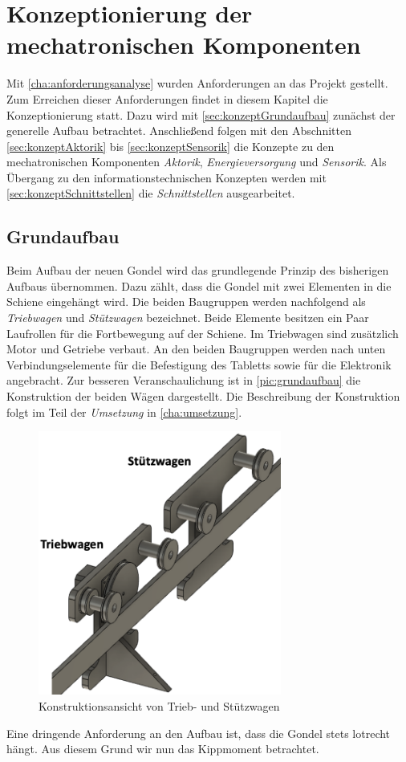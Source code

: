 \chapter{Konzeptionierung der mechatronischen Komponenten}
\label{cha:konzeptionierung}
Mit \autoref{cha:anforderungsanalyse} wurden Anforderungen an das Projekt gestellt. Zum Erreichen dieser Anforderungen findet in diesem Kapitel die Konzeptionierung statt. Dazu wird mit \autoref{sec:konzeptGrundaufbau} zunächst der generelle Aufbau betrachtet. Anschließend folgen mit den Abschnitten \ref{sec:konzeptAktorik} bis \ref{sec:konzeptSensorik} die Konzepte zu den mechatronischen Komponenten \textit{Aktorik}, \textit{Energieversorgung} und \textit{Sensorik}. Als Übergang zu den informationstechnischen Konzepten werden mit \autoref{sec:konzeptSchnittstellen} die \textit{Schnittstellen} ausgearbeitet. \newpage

\section{Grundaufbau}
\label{sec:konzeptGrundaufbau}
Beim Aufbau der neuen Gondel wird das grundlegende Prinzip des bisherigen Aufbaus übernommen. Dazu zählt, dass die Gondel mit zwei Elementen in die Schiene eingehängt wird. Die beiden Baugruppen werden nachfolgend als \textit{Triebwagen} und \textit{Stützwagen} bezeichnet. Beide Elemente besitzen ein Paar Laufrollen für die Fortbewegung auf der Schiene. Im Triebwagen sind zusätzlich Motor und Getriebe verbaut. An den beiden Baugruppen werden nach unten Verbindungselemente für die Befestigung des Tabletts sowie für die Elektronik angebracht. Zur besseren Veranschaulichung ist in  \autoref{pic:grundaufbau} die Konstruktion der beiden Wägen dargestellt. Die Beschreibung der Konstruktion folgt im Teil der \textit{Umsetzung} in \autoref{cha:umsetzung}.


\begin{figure}[h]
	\centering
	\includegraphics[width=8cm]{grundaufbau.png} 
	\caption{Konstruktionsansicht von Trieb- und Stützwagen}
	\label{pic:grundaufbau}
\end{figure}
Eine dringende Anforderung an den Aufbau ist, dass die Gondel stets lotrecht hängt. Aus diesem Grund wir nun das Kippmoment betrachtet. 
\newpage

